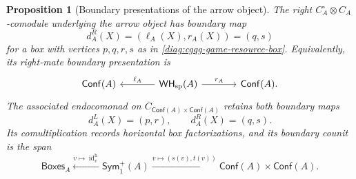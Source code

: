 \documentclass[oneside]{article}
\newcommand{\Boxes}{\mathsf{Boxes}}
\newcommand{\Conf}{\mathsf{Conf}}
\newcommand{\Sym}{\mathsf{Sym}}
\newcommand{\WH}{\mathsf{WH}}
\newcommand{\id}{\operatorname{id}}
\theoremstyle{plain}
\newtheorem{proposition}[theorem]{Proposition}
\theoremstyle{definition}
\theoremstyle{remark}
\begin{document}
\begin{proposition}[Boundary presentations of the arrow object]
\label{prop:cgqg-arrow-right-mate-boundary}
The right \(C_A^\circ\otimes C_A\)-comodule underlying the arrow
object has boundary map
\[
 d_A^{R}(X)=(\ell_A(X),r_A(X))=(q,s)
\]
for a box with vertices \(p,q,r,s\) as in
\eqref{diag:cgqg-game-resource-box}. Equivalently, its right-mate
boundary presentation is
\begin{equation}
 \begin{tikzcd}[column sep=large]
 \Conf(A)&\WH_{\mathrm{sp}}(A)
    \arrow[l,"\ell_A"']\arrow[r,"r_A"]&\Conf(A).
 \end{tikzcd}
 \label{eq:cgqg-arrow-right-mate-boundary}
\end{equation}
The associated endocomonad on \(C_{\Conf(A)\times\Conf(A)}\) retains
both boundary maps
\begin{equation}
 d_A^{L}(X)=(p,r),\qquad d_A^{R}(X)=(q,s).
 \label{eq:cgqg-arrow-endocomonad-boundaries}
\end{equation}
Its comultiplication records horizontal box factorizations, and its
boundary counit is the span
\begin{equation}
 \Boxes_A
 \xleftarrow{v\mapsto\id_v^{\mathrm h}}\Sym^+_1(A)
 \xrightarrow{v\mapsto(s(v),t(v))}
 \Conf(A)\times\Conf(A).
 \label{eq:cgqg-arrow-endocomonad-counit}
\end{equation}
\end{proposition}
\end{document}
